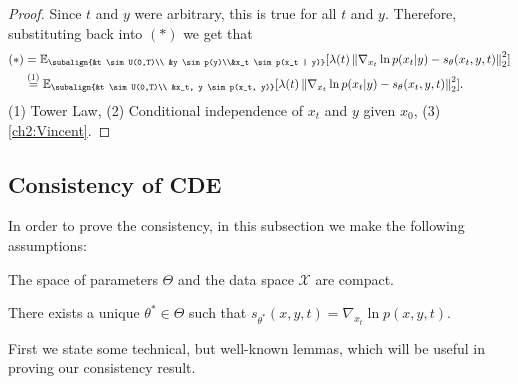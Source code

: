 \begin{proof}
    Since $t$ and $y$ were arbitrary, this is true for all $t$ and $y$. Therefore, substituting back into $(*)$ we get that
    \begin{align*}
        (*) &= \mathbb{E}_{\subalign{&t \sim U(0,T)\\ &y \sim p(y)\\&x_t \sim p(x_t | y)}} 
            [\lambda(t) \norm{\nabla_{x_t} \ln{p(x_t | y)} - s_\theta(x_t, y, t)}_2^2]\\
        &\overset{(1)}{=} \mathbb{E}_{\subalign{&t \sim U(0,T)\\ &x_t, y \sim p(x_t, y)}} 
        [\lambda(t) \norm{\nabla_{x_t} \ln{p(x_t | y)} - s_\theta(x_t, y,t)}_2^2].
    \end{align*}
(1) Tower Law, (2) Conditional independence of $x_t$ and $y$ given $x_0$, (3)  \ref{ch2:Vincent}.
\end{proof}

\subsection{Consistency of CDE}
\label{ch2:appendix:consistency}
In order to prove the consistency, in this subsection we make the following assumptions:
\begin{assumption}
    \label{ch2:assum:compact_1}
    The space of parameters $\Theta$ and the data space $\mathcal{X}$ are compact.
\end{assumption}
\begin{assumption}
    \label{ch2:assum:unique}
    There exists a unique $\theta^\ast \in \Theta$ such that $s_{\theta^\ast}(x,y,t) = \nabla_{x_t}\ln p (x,y,t)$.
\end{assumption}

First we state some technical, but well-known lemmas, which will be useful in proving our consistency result.

